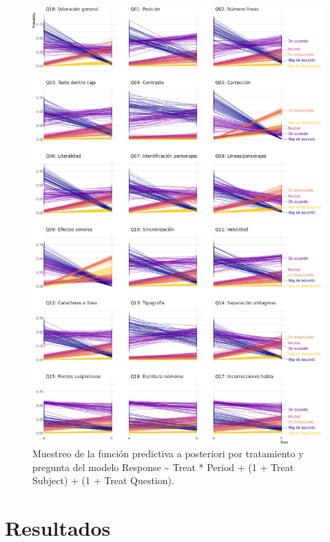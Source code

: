 \documentclass[
  12pt,
  a4paper,
  extrafontsizes,
  onecolumn,
  openright]{memoir}
\begin{document}
\begin{figure}[h]

{\centering \includegraphics[width=1\textwidth,height=\textheight]{images/bayes-preg.png}

}

\caption{\label{fig-pred-3}Muestreo de la función predictiva a
posteriori por tratamiento y pregunta del modelo Response
\textasciitilde{} Treat * Period + (1 + Treat \textbar{} Subject) + (1 +
Treat \textbar{} Question).}

\end{figure}


\hypertarget{resultados}{%
\chapter{Resultados}\label{resultados}}
\end{document}

